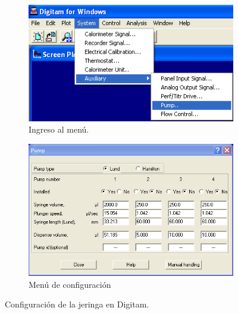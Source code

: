	\begin{figure}[h]
		\centering
		\begin{subfigure}[b]{0.4\textwidth}
			\includegraphics[width=\linewidth]{Figures/jeringa_menu}
			\caption{Ingreso al menú.}
			\label{fig: menuJeringa}
		\end{subfigure}
		\begin{subfigure}[b]{0.55\textwidth}
			\includegraphics[width=\linewidth]{Figures/jeringa_config}
			\caption{Menú de configuración}
			\label{fig: configJeringa}
		\end{subfigure}
		\caption{Configuración de la jeringa en Digitam.}
	\end{figure}
	\newpage
	
